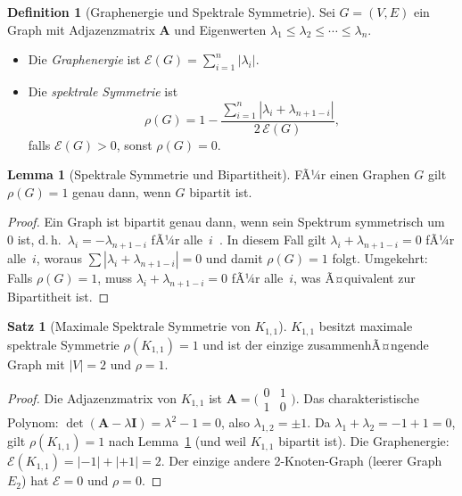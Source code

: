 ﻿\documentclass[a4paper,12pt]{article}
\theoremstyle{definition}
\newtheorem{definition}{Definition}
\newtheorem{satz}{Satz}
\newtheorem{lemma}{Lemma}
\begin{document}
\begin{definition}[Graphenergie und Spektrale Symmetrie]
	\label{def:spektral}
	Sei $G = (V, E)$ ein Graph mit Adjazenzmatrix $\mathbf{A}$ und Eigenwerten
	$\lambda_1 \leq \lambda_2 \leq \cdots \leq \lambda_n$.
	\begin{itemize}
		\item Die \emph{Graphenergie} ist $\mathcal{E}(G) = \sum_{i=1}^n |\lambda_i|$.
		\item Die \emph{spektrale Symmetrie} ist
		\[
			\rho(G) = 1 - \frac{\sum_{i=1}^n |\lambda_i + \lambda_{n+1-i}|}{2\,\mathcal{E}(G)},
		\]
		falls $\mathcal{E}(G) > 0$, sonst $\rho(G) = 0$.
	\end{itemize}
\end{definition}

\begin{lemma}[Spektrale Symmetrie und Bipartitheit]
	\label{lem:bipspek}
	FÃ¼r einen Graphen $G$ gilt $\rho(G) = 1$ genau dann, wenn $G$ bipartit ist.
\end{lemma}

\begin{proof}
	Ein Graph ist bipartit genau dann, wenn sein Spektrum symmetrisch um~$0$ ist,
	d.\,h.\ $\lambda_i = -\lambda_{n+1-i}$ fÃ¼r alle~$i$~\cite{bondy2008}.
	In diesem Fall gilt $\lambda_i + \lambda_{n+1-i} = 0$ fÃ¼r alle~$i$, woraus
	$\sum|\lambda_i + \lambda_{n+1-i}| = 0$ und damit $\rho(G) = 1$ folgt.
	Umgekehrt: Falls $\rho(G) = 1$, muss $\lambda_i + \lambda_{n+1-i} = 0$ fÃ¼r alle~$i$,
	was Ã¤quivalent zur Bipartitheit ist. \qedhere
\end{proof}

\begin{satz}[Maximale Spektrale Symmetrie von $K_{1,1}$]
	\label{satz:spektral}
	$K_{1,1}$ besitzt maximale spektrale Symmetrie $\rho(K_{1,1}) = 1$ und
	ist der einzige zusammenhÃ¤ngende Graph mit $|V| = 2$ und $\rho = 1$.
\end{satz}

\begin{proof}
	Die Adjazenzmatrix von $K_{1,1}$ ist
	$\mathbf{A} = \bigl(\begin{smallmatrix}0&1\\1&0\end{smallmatrix}\bigr)$.
	Das charakteristische Polynom: $\det(\mathbf{A} - \lambda\mathbf{I})
	= \lambda^2 - 1 = 0$, also $\lambda_{1,2} = \pm 1$.
	Da $\lambda_1 + \lambda_2 = -1 + 1 = 0$, gilt $\rho(K_{1,1}) = 1$ nach
	Lemma~\ref{lem:bipspek} (und weil $K_{1,1}$ bipartit ist).
	Die Graphenergie: $\mathcal{E}(K_{1,1}) = |-1| + |+1| = 2$.
	Der einzige andere 2-Knoten-Graph (leerer Graph $E_2$) hat $\mathcal{E} = 0$
	und $\rho = 0$. \qedhere
\end{proof}
\end{document}
